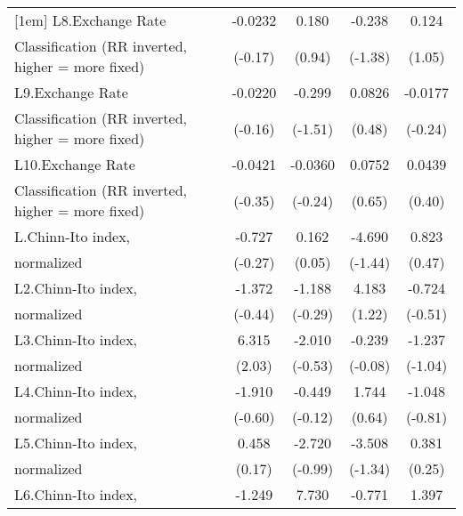 {\begin{tabular}{l*{4}{c}}
[1em]
L8.Exchange Rate    &     -0.0232         &       0.180         &      -0.238         &       0.124         \\
Classification (RR inverted, higher = more fixed)&     (-0.17)         &      (0.94)         &     (-1.38)         &      (1.05)         \\
[1em]
L9.Exchange Rate    &     -0.0220         &      -0.299         &      0.0826         &     -0.0177         \\
Classification (RR inverted, higher = more fixed)&     (-0.16)         &     (-1.51)         &      (0.48)         &     (-0.24)         \\
[1em]
L10.Exchange Rate   &     -0.0421         &     -0.0360         &      0.0752         &      0.0439         \\
Classification (RR inverted, higher = more fixed)&     (-0.35)         &     (-0.24)         &      (0.65)         &      (0.40)         \\
[1em]
L.Chinn-Ito index,  &      -0.727         &       0.162         &      -4.690         &       0.823         \\
normalized          &     (-0.27)         &      (0.05)         &     (-1.44)         &      (0.47)         \\
[1em]
L2.Chinn-Ito index, &      -1.372         &      -1.188         &       4.183         &      -0.724         \\
normalized          &     (-0.44)         &     (-0.29)         &      (1.22)         &     (-0.51)         \\
[1em]
L3.Chinn-Ito index, &       6.315\sym{*}  &      -2.010         &      -0.239         &      -1.237         \\
normalized          &      (2.03)         &     (-0.53)         &     (-0.08)         &     (-1.04)         \\
[1em]
L4.Chinn-Ito index, &      -1.910         &      -0.449         &       1.744         &      -1.048         \\
normalized          &     (-0.60)         &     (-0.12)         &      (0.64)         &     (-0.81)         \\
[1em]
L5.Chinn-Ito index, &       0.458         &      -2.720         &      -3.508         &       0.381         \\
normalized          &      (0.17)         &     (-0.99)         &     (-1.34)         &      (0.25)         \\
[1em]
L6.Chinn-Ito index, &      -1.249         &       7.730\sym{*}  &      -0.771         &       1.397         \\

\end{tabular}}

